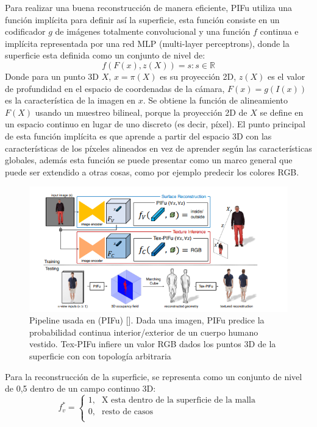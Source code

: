 Para realizar una buena reconstrucción de manera eficiente, PIFu utiliza una función implícita para definir así la superficie, esta función consiste en un codificador $g$ de imágenes totalmente convolucional y una función $f$ continua e implícita representada por una red MLP (multi-layer perceptrons), donde la superficie esta definida como un conjunto de nivel de:
\begin{equation}
	\label{eq:1}
	f(F(x), z(X)) = s : s \in \mathbb{R}
\end{equation}
Donde para un punto 3D $X$, $x = \pi(X)$ es su proyección 2D, $z(X)$ es el valor de profundidad en el espacio de coordenadas de la cámara, $F(x) = g(I(x))$ es la característica de la imagen en $x$. Se obtiene la función de alineamiento $F(X)$ usando un muestreo bilineal, porque la proyección 2D de $X$ se define en un espacio continuo en lugar de uno discreto (es decir, píxel).
El punto principal de esta función implícita es que aprende a partir del espacio 3D con las características de los píxeles alineados en vez de aprender según las características globales, además esta función se puede presentar como un marco general que puede ser extendido a otras cosas, como por ejemplo predecir los colores RGB.


\begin{figure}[H]
	\centering
	\includegraphics[scale=0.7]{imagenes/antecedentes2.png}
	\caption{Pipeline usada en (PIFu) [\cite{pifu}]. Dada una imagen, PIFu predice la probabilidad continua interior/exterior de un cuerpo humano vestido. Tex-PIFu infiere un valor RGB dados los puntos 3D de la superficie con  con topología arbitraria}
	\label{fig:figura8}
\end{figure}

Para la reconstrucción de la superficie, se representa como un conjunto de nivel de 0,5 dentro de un campo continuo 3D:
\begin{equation}
	\label{eq:2}
	f_{v}^{*} = \begin{cases}
		1\text{,}  & \text{X esta dentro de la superficie de la malla}\\
		0\text{,}  & \text{resto de casos}\\
	\end{cases}
\end{equation}

